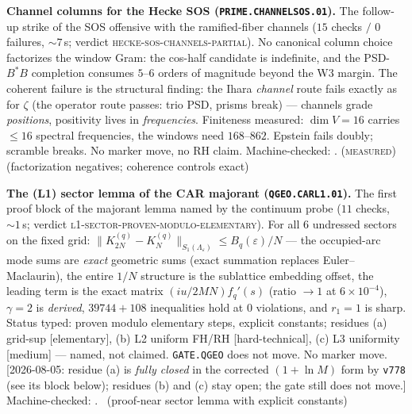 \documentclass[11pt,a4paper]{article}
\theoremstyle{definition}
\begin{document}
\par\smallskip\noindent\textbf{Channel columns for the Hecke SOS
(\texttt{PRIME.CHANNELSOS.01}).}
The follow-up strike of the SOS offensive with the ramified-fiber
channels ($15$ checks $/$ $0$ failures, ${\sim}7$\,s; verdict
\textsc{hecke-sos-channels-partial}).  No canonical column choice
factorizes the window Gram: the cos-half candidate is indefinite,
and the PSD-$B^*B$ completion consumes $5$--$6$ orders of magnitude
beyond the W3 margin.  The coherent failure is the structural
finding: the Ihara \emph{channel} route fails exactly as for
$\zeta$ (the operator route passes: trio PSD, prisms break) ---
channels grade \emph{positions}, positivity lives in
\emph{frequencies}.  Finiteness measured: $\dim V=16$ carries
$\le16$ spectral frequencies, the windows need $168$--$862$.
Epstein fails doubly; scramble breaks.  No marker move, no RH
claim.
Machine-checked: .
(\textsc{measured}) (factorization negatives; coherence controls
exact)
\par\smallskip

\par\smallskip\noindent\textbf{The (L1) sector lemma of the CAR
majorant (\texttt{QGEO.CARL1.01}).}
The first proof block of the majorant lemma named by the continuum
probe ($11$ checks, ${\sim}1$\,s; verdict
\textsc{l1-sector-proven-modulo-elementary}).  For all $6$
undressed sectors on the fixed grid:
$\|K_{2N}^{(q)}-K_N^{(q)}\|_{S_1(\Lambda_\varepsilon)}\le
B_q(\varepsilon)/N$ --- the occupied-arc mode sums are \emph{exact}
geometric sums (exact summation replaces Euler--Maclaurin), the
entire $1/N$ structure is the sublattice embedding offset, the
leading term is the exact matrix $(iu/2MN)f_q'(s)$ (ratio $\to1$ at
$6\times10^{-4}$), $\gamma=2$ is \emph{derived}, $39744{+}108$
inequalities hold at $0$ violations, and $r_1=1$ is sharp.  Status
typed: proven modulo elementary steps, explicit constants; residues
(a) grid-sup [elementary], (b) L2 uniform FH/RH [hard-technical],
(c) L3 uniformity [medium] --- named, not claimed.
\texttt{GATE.QGEO} does not move.  No marker move.
[2026-08-05: residue (a) is \emph{fully closed} in the corrected
$(1+\ln M)$ form by \texttt{v778} (see its block below); residues
(b) and (c) stay open; the gate still does not move.]
Machine-checked: .
\mE\ (proof-near sector lemma with explicit constants)
\par\smallskip
\end{document}
